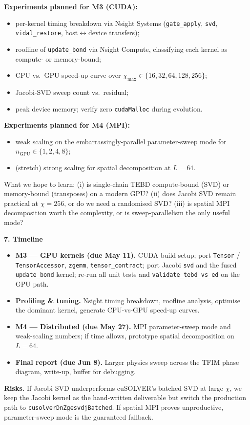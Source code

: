 \documentclass[11pt]{article}
\begin{document}
\textbf{Experiments planned for M3 (CUDA):}
\begin{itemize}
    \item per-kernel timing breakdown via Nsight Systems (\texttt{gate\_apply}, \texttt{svd}, \texttt{vidal\_restore}, host$\leftrightarrow$device transfers);
    \item roofline of \texttt{update\_bond} via Nsight Compute, classifying each kernel as compute- or memory-bound;
    \item CPU vs.\ GPU speed-up curve over $\chi_{\max} \in \{16, 32, 64, 128, 256\}$;
    \item Jacobi-SVD sweep count vs.\ residual;
    \item peak device memory; verify zero \texttt{cudaMalloc} during evolution.
\end{itemize}

\textbf{Experiments planned for M4 (MPI):}
\begin{itemize}
    \item weak scaling on the embarrassingly-parallel parameter-sweep mode for $n_{\mathrm{GPU}} \in \{1, 2, 4, 8\}$;
    \item (stretch) strong scaling for spatial decomposition at $L = 64$.
\end{itemize}

What we hope to learn: (i) is single-chain TEBD compute-bound (SVD) or memory-bound (transposes) on a modern GPU? (ii) does Jacobi SVD remain practical at $\chi = 256$, or do we need a randomised SVD? (iii) is spatial MPI decomposition worth the complexity, or is sweep-parallelism the only useful mode?

\vspace{0.4em}
\textbf{7. Timeline}

\begin{itemize}
    \item \textbf{M3 --- GPU kernels (due May 11).} CUDA build setup; port \texttt{Tensor} / \texttt{TensorAccessor}, \texttt{zgemm}, \texttt{tensor\_contract}; port Jacobi \texttt{svd} and the fused \texttt{update\_bond} kernel; re-run all unit tests and \texttt{validate\_tebd\_vs\_ed} on the GPU path.

    \item \textbf{Profiling \& tuning.} Nsight timing breakdown, roofline analysis, optimise the dominant kernel, generate CPU-vs-GPU speed-up curves.

    \item \textbf{M4 --- Distributed (due May 27).} MPI parameter-sweep mode and weak-scaling numbers; if time allows, prototype spatial decomposition on $L = 64$.

    \item \textbf{Final report (due Jun 8).} Larger physics sweep across the TFIM phase diagram, write-up, buffer for debugging.
\end{itemize}

\textbf{Risks.} If Jacobi SVD underperforms cuSOLVER's batched SVD at large $\chi$, we keep the Jacobi kernel as the hand-written deliverable but switch the production path to \texttt{cusolverDnZgesvdjBatched}. If spatial MPI proves unproductive, parameter-sweep mode is the guaranteed fallback.
\end{document}

